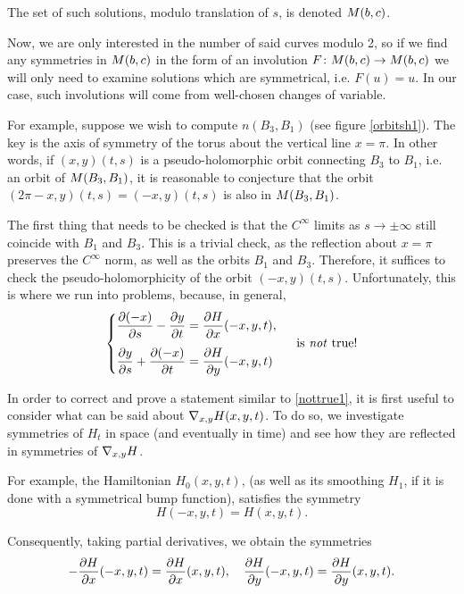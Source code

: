 The set of such solutions, modulo translation of $s$, is denoted $M(b,c)$.

Now, we are only interested in the number of said curves modulo 2, so if we find any symmetries in $M(b,c)$ in the form of an involution $F \colon M(b,c) \to M(b,c)$ we will only need to examine solutions which are symmetrical, i.e. $F(u) = u$. In our case, such involutions will come from well-chosen changes of variable.

For example, suppose we wish to compute $n(B_3, B_1)$ (see figure \ref{orbitsh1}). The key is the axis of symmetry of the torus about the vertical line $x = \pi$. In other words, if $(x,y)(t,s)$ is a pseudo-holomorphic orbit connecting $B_3$ to $B_1$, i.e. an orbit of $M(B_3,B_1)$, it is reasonable to conjecture that the orbit $(2\pi-x, y)(t,s) = (-x,y)(t,s)$ is also in $M(B_3,B_1)$.

The first thing that needs to be checked is that the $C^\infty$ limits as $s \to \pm \infty$ still coincide with $B_1$ and $B_3$. This is a trivial check, as the reflection about $x = \pi$ preserves the $C^\infty$ norm, as well as the orbits $B_1$ and $B_3$. Therefore, it suffices to check the pseudo-holomorphicity of the orbit $(-x,y)(t,s)$. Unfortunately, this is where we run into problems, because, in general,
\begin{equation}
\label{nottrue1}
\begin{cases}
\displaystyle \diffp{(-x)} s - \diffp y t = \diffp H x(-x,y,t),\\[1em]
\displaystyle \diffp y s + \diffp{(-x)} t = \diffp H y(-x,y,t)
\end{cases}
\text{ is \emph{not} true!}
\end{equation}

In order to correct and prove a statement similar to \eqref{nottrue1}, it is first useful to consider what can be said about $\nabla_{x,y} H(x,y,t)$. To do so, we investigate symmetries of $H_t$ in space (and eventually in time) and see how they are reflected in symmetries of $\nabla_{x,y} H$.

For example, the Hamiltonian $H_0(x,y,t)$, (as well as its smoothing $H_1$, if it is done with a symmetrical bump function), satisfies the symmetry
\begin{equation}
H(-x,y,t) = H(x,y,t).
\end{equation}

Consequently, taking partial derivatives, we obtain the symmetries
\begin{equation}\label{eq:symmetries1}
- \diffp H x(-x,y,t) = \diffp H x(x,y,t),\quad \diffp H y(-x,y,t) = \diffp H y (x,y,t).
\end{equation}

